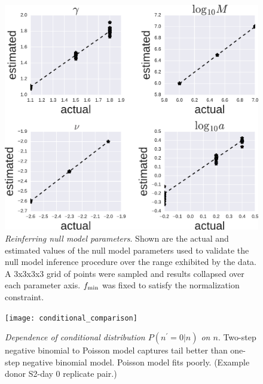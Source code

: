 

\begin{figure}
\includegraphics[width=\linewidth]{NB_Pois_nullpara_fits}
\centering{}
\caption{
\emph{Reinferring null model parameters}. Shown are the actual and estimated values of the null model parameters used to validate the null model inference procedure over the range exhibited by the data. A 3x3x3x3 grid of points were sampled and results collapsed over each parameter axis. $f_{\rm min}$ was fixed to satisfy the normalization constraint.
}
\label{fig:SM_reinfer_null}
\end{figure}

\begin{figure}
\texttt{[image: conditional\_comparison]}
\centering{}
\caption{
\emph{Dependence of conditional distribution $P(n^\prime=0|n)$ on $n$}. Two-step negative binomial to Poisson model captures tail better than one-step negative binomial model. Poisson model fits poorly. (Example donor S2-day 0 replicate pair.)\label{fig:SM_twostep_better}
}
\end{figure}



